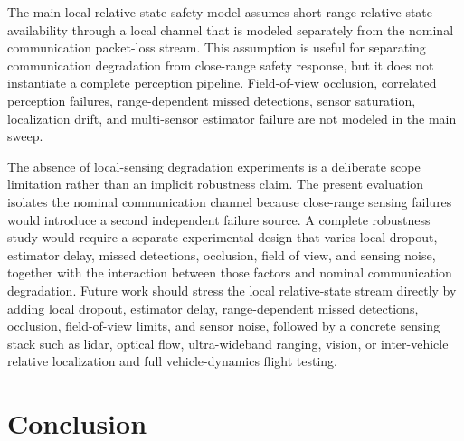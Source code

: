 \documentclass[11pt]{article}
\begin{document}
The main local relative-state safety model assumes short-range relative-state availability through a local channel that is modeled separately from the nominal communication packet-loss stream. This assumption is useful for separating communication degradation from close-range safety response, but it does not instantiate a complete perception pipeline. Field-of-view occlusion, correlated perception failures, range-dependent missed detections, sensor saturation, localization drift, and multi-sensor estimator failure are not modeled in the main sweep.

The absence of local-sensing degradation experiments is a deliberate scope limitation rather than an implicit robustness claim. The present evaluation isolates the nominal communication channel because close-range sensing failures would introduce a second independent failure source. A complete robustness study would require a separate experimental design that varies local dropout, estimator delay, missed detections, occlusion, field of view, and sensing noise, together with the interaction between those factors and nominal communication degradation. Future work should stress the local relative-state stream directly by adding local dropout, estimator delay, range-dependent missed detections, occlusion, field-of-view limits, and sensor noise, followed by a concrete sensing stack such as lidar, optical flow, ultra-wideband ranging, vision, or inter-vehicle relative localization and full vehicle-dynamics flight testing.

\section{Conclusion}
\end{document}

